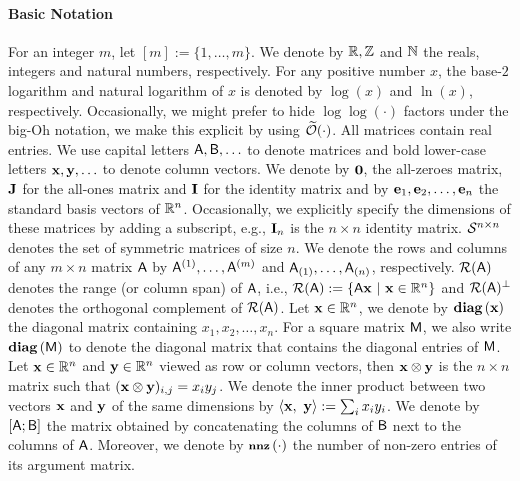 \paragraph{Basic Notation}
%
For an integer $m$, let $[m]:=\{1,\ldots,m\}$. We denote by $\mathbb{R}, \mathbb{Z}$ and $\mathbb{N}$ the reals, integers and natural numbers, respectively. For any positive number $x$, the base-$2$ logarithm and natural logarithm of $x$ is denoted by $\log(x)$ and $\ln (x)$, respectively. Occasionally, we might prefer to hide $\log\log(\cdot)$ factors under the big-Oh notation, we make this explicit by using $\widetilde{\mathcal{O}}(\cdot)$. All matrices contain real entries. We use capital letters ${\mathsf{A} },{\mathsf{B} },\ldots$ to denote matrices and bold lower-case letters $\mathbf{x},\mathbf{y},\ldots$ to denote column vectors. We denote by $\mathbf{0}$, the all-zeroes matrix, $\mathbf{J}$ for the all-ones matrix and $\mathbf{I}$ for the identity matrix and by ${\mathbf e}_1,{\mathbf e}_2,\ldots ,{\mathbf e}_n$ the standard basis vectors of $\mathbb{R}^n$. Occasionally, we explicitly specify the dimensions of these matrices by adding a subscript, e.g., $\mathbf{I}_n$ is the $n\times n $ identity matrix. $\mathcal{S}^{n\times n}$ denotes the set of symmetric matrices of size $n$. We denote the rows and columns of any $m\times n$ matrix ${\mathsf{A} }$ by ${\mathsf{A} }^{(1)}, \ldots , {\mathsf{A} }^{(m)}$ and ${\mathsf{A} }_{(1)},\ldots , {\mathsf{A} }_{(n)}$, respectively. $\mathcal{R}({\mathsf{A} })$ denotes the range (or column span) of ${\mathsf{A} }$, i.e., $\colspan{\matA}:=\{\matA \x\ | \ \x\in\RR^n\}$ and $\mathcal{R}({\mathsf{A} })^{\bot}$ denotes the orthogonal complement of $\mathcal{R}({\mathsf{A} })$. Let $\mathbf{x}\in\mathbb{R}^n$, we denote by $\operatorname{\textbf{diag}}\left(\mathbf{x}\right)$ the diagonal matrix containing $x_1,x_2,\ldots ,x_n$. For a square matrix ${\mathsf{M} }$, we also write $\operatorname{\textbf{diag}}\left({\mathsf{M} }\right)$ to denote the diagonal matrix that contains the diagonal entries of ${\mathsf{M} }$. Let $\mathbf{x}\in\mathbb{R}^n$ and $\mathbf{y}\in\mathbb{R}^n$ viewed as row or column vectors, then $\mathbf{x}\otimes \mathbf{y}$ is the $n\times n$ matrix such that $ (\mathbf{x} \otimes \mathbf{y})_{i,j} =x_i y_j$. We denote the inner product between two vectors $\mathbf{x}$ and $\mathbf{y}$ of the same dimensions by $\left\langle {\mathbf{x}},\ {\mathbf{y}} \right\rangle:=\sum_{i} x_i y_i$. We denote by $[{\mathsf{A} } ; {\mathsf{B} }]$ the matrix obtained by concatenating the columns of ${\mathsf{B} }$ next to the columns of ${\mathsf{A} }$. Moreover, we denote by $\operatorname{\textbf{\footnotesize nnz}}\left(\cdot\right)$ the number of non-zero entries of its argument matrix.

%
